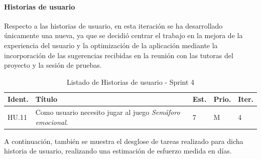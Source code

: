 \paragraph{Historias de usuario}
Respecto a las historias de usuario, en esta iteración se ha desarrollado únicamente una nueva, ya que se decidió centrar el trabajo en la mejora de la experiencia del usuario y la optimización de la aplicación mediante la incorporación de las sugerencias recibidas en la reunión con las tutoras del proyecto y la sesión de pruebas.

\begin{table}[H]
\centering
\begin{tabularx}{\textwidth}{|X|p{}|X|X|X|}
\hline
\textbf{Ident.} & \textbf{Título} & \textbf{Est.} & \textbf{Prio.} & \textbf{Iter.} \\
\hline
HU.11 & Como usuario necesito jugar al juego \textit{Semáforo emocional}. & 7 & M & 4 \\
\hline
\end{tabularx}
\caption{Listado de Historias de usuario - Sprint 4}
\end{table}

A continuación, también se muestra el desglose de tareas realizado para dicha historia de usuario, realizando una estimación de esfuerzo medida en días.

